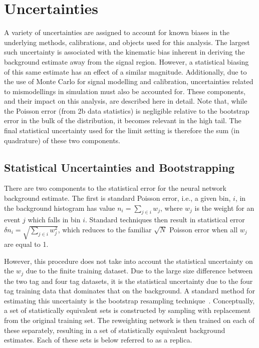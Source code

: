 


\FloatBarrier
\clearpage
\section{Uncertainties}
\label{sec:systematics}
A variety of uncertainties are assigned to account for known biases in the
underlying methods, calibrations, and objects used for this analysis. The
largest such uncertainty is associated with the kinematic bias inherent in
deriving the background estimate away from the signal region. However, a
statistical biasing of this same estimate has an effect of a similar magnitude.
Additionally, due to the use of Monte Carlo for signal modelling and \btag
calibration, uncertainties related to mismodellings in simulation must also be
accounted for. These components, and their impact on this analysis, are
described here in detail. Note that, while the Poisson
error (from 2b data statistics) is negligible relative to the bootstrap error 
in the bulk of the distribution, it becomes relevant in the high \mhh tail. 
The final statistical uncertainty used for the limit setting is therefore the 
sum (in quadrature) of these two components. 

\subsection{Statistical Uncertainties and Bootstrapping}
There are two components to the statistical error for the neural network
background estimate. The first is standard Poisson error, i.e., a given bin,
$i$, in the background histogram has value $n_i = \sum\limits_{j\in i} w_j$,
where $w_j$ is the weight for an event $j$ which falls in bin $i$. Standard
techniques then result in statistical error $\delta n_i =
	\sqrt{\sum\limits_{j\in i} w_j^2}$, which reduces to the familiar $\sqrt{N}$
Poisson error when all $w_j$ are equal to 1.

However, this procedure does not take into account the statistical uncertainty
on the $w_j$ due to the finite training dataset. Due to the large size
difference between the two tag and four tag datasets, it is the statistical
uncertainty due to the four tag training data that dominates that on the
background. A standard method for estimating this uncertainty is the bootstrap
resampling technique~\cite{Bootstrap}. Conceptually, a set of statistically
equivalent sets is constructed by sampling with replacement from the original
training set. The reweighting network is then trained on each of these
separately, resulting in a set of statistically equivalent background estimates.
Each of these sets is below referred to as a replica.

